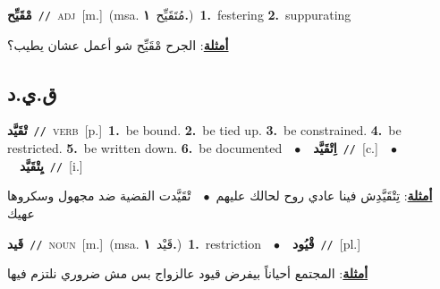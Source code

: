 \documentclass[10pt,a4paper,twoside]{article} %
\begin{document}
\begin{multicols}{2}
{\setlength\topsep{0pt}\textbf{\foreignlanguage{arabic}{مْقَيِّح}}\ {\color{gray}\texttt{//}\color{black}}\ \textsc{adj}\ [m.]\ \color{gray}(msa. \foreignlanguage{arabic}{مُتَقَيِّح}~\foreignlanguage{arabic}{\textbf{١.}})\color{black}\ \textbf{1.}~festering  \textbf{2.}~suppurating\  \begin{flushright}\color{gray}\foreignlanguage{arabic}{\textbf{\underline{\foreignlanguage{arabic}{أمثلة}}}: الجرح مْقَيِّح شو أعمل عشان يطيب؟}\end{flushright}\color{black}} \vspace{2mm}

\vspace{-3mm}
\subsection*{\color{blue}\foreignlanguage{arabic}{ق.ي.د}\color{blue}{}} 

{\setlength\topsep{0pt}\textbf{\foreignlanguage{arabic}{تْقَيَّد}}\ {\color{gray}\texttt{//}\color{black}}\ \textsc{verb}\ [p.]\ \textbf{1.}~be bound.  \textbf{2.}~be tied up.  \textbf{3.}~be constrained.  \textbf{4.}~be restricted.  \textbf{5.}~be written down.  \textbf{6.}~be documented\ \ $\bullet$\ \ \setlength\topsep{0pt}\textbf{\foreignlanguage{arabic}{اِتْقَيَّد}}\ {\color{gray}\texttt{//}\color{black}}\ [c.]\ \ $\bullet$\ \ \setlength\topsep{0pt}\textbf{\foreignlanguage{arabic}{يِتْقَيَّد}}\ {\color{gray}\texttt{//}\color{black}}\ [i.]\  \begin{flushright}\color{gray}\foreignlanguage{arabic}{\textbf{\underline{\foreignlanguage{arabic}{أمثلة}}}: تِتْقَيَّدِش فينا عادي روح لحالك عليهم\ $\bullet$\ \  تْقَيَّدت القضية ضد مجهول وسكروها عهيك}\end{flushright}\color{black}} \vspace{2mm}

{\setlength\topsep{0pt}\textbf{\foreignlanguage{arabic}{قَيد}}\ {\color{gray}\texttt{//}\color{black}}\ \textsc{noun}\ [m.]\ \color{gray}(msa. \foreignlanguage{arabic}{قَيْد}~\foreignlanguage{arabic}{\textbf{١.}})\color{black}\ \textbf{1.}~restriction\ \ $\bullet$\ \ \setlength\topsep{0pt}\textbf{\foreignlanguage{arabic}{قْيُود}}\ {\color{gray}\texttt{//}\color{black}}\ [pl.]\  \begin{flushright}\color{gray}\foreignlanguage{arabic}{\textbf{\underline{\foreignlanguage{arabic}{أمثلة}}}: المجتمع أحياناً بيفرض قيود عالزواج بس مش ضروري نلتزم فيها}\end{flushright}\color{black}} \vspace{2mm}


\end{multicols}
\end{document}

